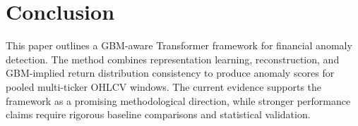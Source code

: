 \section{Conclusion}

This paper outlines a GBM-aware Transformer framework for financial anomaly detection. The method combines representation learning, reconstruction, and GBM-implied return distribution consistency to produce anomaly scores for pooled multi-ticker OHLCV windows. The current evidence supports the framework as a promising methodological direction, while stronger performance claims require rigorous baseline comparisons and statistical validation.

